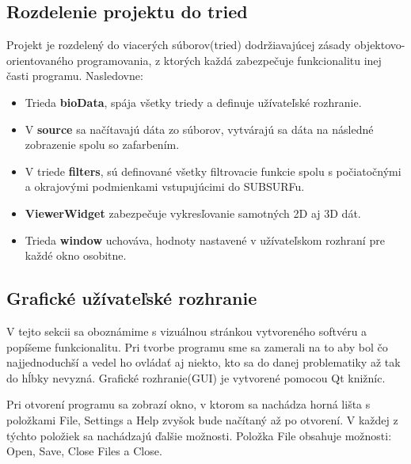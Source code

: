 \documentclass[a4paper,12pt,twoside]{article}%
\begin{document}
\subsection{Rozdelenie projektu do tried}

Projekt je rozdelený do viacerých súborov(tried) dodržiavajúcej zásady objektovo-orientovaného programovania, z ktorých každá zabezpečuje funkcionalitu inej časti programu. Nasledovne:

\begin{itemize}
\item Trieda \textbf{bioData}, spája všetky triedy a definuje užívateľské rozhranie.
\item V \textbf{source} sa načítavajú dáta zo súborov, vytvárajú sa dáta na následné zobrazenie spolu so zafarbením.   
\item V triede \textbf{filters}, sú definované všetky filtrovacie funkcie spolu s počiatočnými a okrajovými podmienkami vstupujúcimi do SUBSURFu.
\item \textbf{ViewerWidget} zabezpečuje vykresľovanie samotných 2D aj 3D dát.
\item Trieda \textbf{window} uchováva, hodnoty nastavené v užívateľskom rozhraní pre každé okno osobitne.

\end{itemize}


\subsection{Grafické užívateľské rozhranie}

V tejto sekcii sa oboznámime s vizuálnou stránkou vytvoreného softvéru a popíšeme funkcionalitu. Pri tvorbe programu sme sa zamerali na to aby bol čo najjednoduchší a vedel ho ovládať aj niekto, kto sa do danej problematiky až tak do hĺbky nevyzná. Grafické rozhranie(GUI) je vytvorené pomocou Qt knižníc.

Pri otvorení programu sa zobrazí okno, v ktorom sa nachádza horná lišta s položkami File, Settings a Help zvyšok bude načítaný až po otvorení. V každej z týchto položiek sa nachádzajú ďalšie možnosti. Položka File obsahuje možnosti: Open, Save, Close Files a Close.
\end{document}
